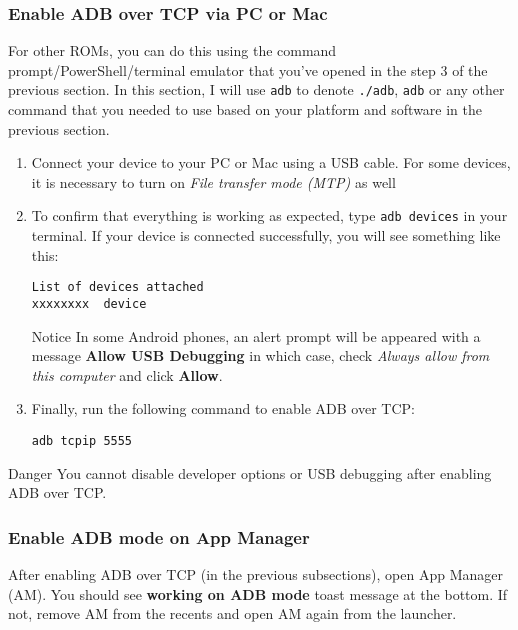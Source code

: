 \subsubsection{Enable ADB over TCP via PC or Mac}\label{subsubsec:enable-adb-over-tcp-via-pc-or-mac} %
For other ROMs, you can do this using the command prompt/PowerShell/terminal emulator that you've opened in the step 3
of the previous section. In this section, I will use \texttt{adb} to denote \texttt{./adb}, \texttt{adb} or any other
command that you needed to use based on your platform and software in the previous section.
\begin{enumerate}
    \item Connect your device to your PC or Mac using a USB cable. For some devices, it is necessary to turn on
    \textit{File transfer mode (MTP)} as well
    \item To confirm that everything is working as expected, type \texttt{adb devices} in your terminal. If your device
    is connected successfully, you will see something like this:
    \begin{Verbatim}
List of devices attached
xxxxxxxx  device
    \end{Verbatim}
    \begin{tip}{Notice}
        In some Android phones, an alert prompt will be appeared with a message \textbf{Allow USB Debugging}
        in which case, check \textit{Always allow from this computer} and click \textbf{Allow}.
    \end{tip}
    \item Finally, run the following command to enable ADB over TCP:
    \begin{verbatim}
adb tcpip 5555
    \end{verbatim}
\end{enumerate}

\begin{danger}{Danger}
    You cannot disable developer options or USB debugging after enabling ADB over TCP\@.
\end{danger}

\subsubsection{Enable ADB mode on App Manager}\label{subsubsec:adb-mode-on-app-manager} %
After enabling ADB over TCP (in the previous subsections), open App Manager (AM). You should see \textbf{working on ADB
mode} toast message at the bottom. If not, remove AM from the recents and open AM again from the launcher.

